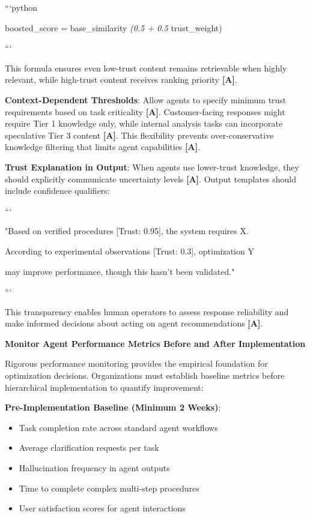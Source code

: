 \documentclass[a4paper,11pt]{article}
\newcommand{\alabel}{\textbf{\textcolor{acolor}{[A]}}}
\begin{document}
```python

boosted\_score = base\_similarity \textit{ (0.5 + 0.5 } trust\_weight)

```


This formula ensures even low-trust content remains retrievable when highly relevant, while high-trust content receives ranking priority \alabel{}.


\textbf{Context-Dependent Thresholds}: Allow agents to specify minimum trust requirements based on task criticality \alabel{}. Customer-facing responses might require Tier 1 knowledge only, while internal analysis tasks can incorporate speculative Tier 3 content \alabel{}. This flexibility prevents over-conservative knowledge filtering that limits agent capabilities \alabel{}.


\textbf{Trust Explanation in Output}: When agents use lower-trust knowledge, they should explicitly communicate uncertainty levels \alabel{}. Output templates should include confidence qualifiers:


```

"Based on verified procedures [Trust: 0.95], the system requires X.

According to experimental observations [Trust: 0.3], optimization Y

may improve performance, though this hasn't been validated."

```


This transparency enables human operators to assess response reliability and make informed decisions about acting on agent recommendations \alabel{}.


\textbf{Monitor Agent Performance Metrics Before and After Implementation}\par

Rigorous performance monitoring provides the empirical foundation for optimization decisions. Organizations must establish baseline metrics before hierarchical implementation to quantify improvement:


\textbf{Pre-Implementation Baseline (Minimum 2 Weeks)}:

\begin{itemize}
  \item Task completion rate across standard agent workflows
  \item Average clarification requests per task
  \item Hallucination frequency in agent outputs
  \item Time to complete complex multi-step procedures
  \item User satisfaction scores for agent interactions
\end{itemize}
\end{document}
